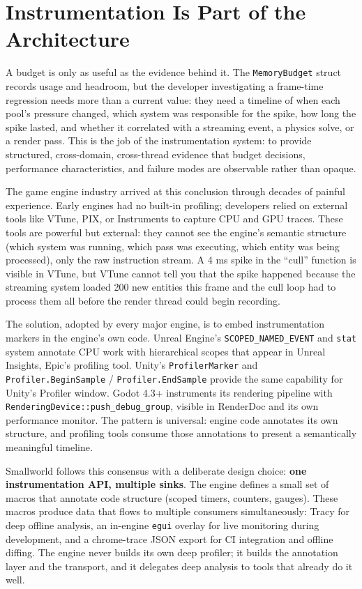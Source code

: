 \documentclass[
  11pt,
  letterpaper,
  DIV=11,
  numbers=noendperiod,
  twoside,
  open=right]{scrreprt}
\begin{document}
\section{Instrumentation Is Part of the
Architecture}\label{sec-instrumentation}

A budget is only as useful as the evidence behind it. The
\texttt{MemoryBudget} struct records usage and headroom, but the
developer investigating a frame-time regression needs more than a
current value: they need a timeline of when each pool's pressure
changed, which system was responsible for the spike, how long the spike
lasted, and whether it correlated with a streaming event, a physics
solve, or a render pass. This is the job of the instrumentation system:
to provide structured, cross-domain, cross-thread evidence that budget
decisions, performance characteristics, and failure modes are observable
rather than opaque.

The game engine industry arrived at this conclusion through decades of
painful experience. Early engines had no built-in profiling; developers
relied on external tools like VTune, PIX, or Instruments to capture CPU
and GPU traces. These tools are powerful but external: they cannot see
the engine's semantic structure (which system was running, which pass
was executing, which entity was being processed), only the raw
instruction stream. A 4 ms spike in the ``cull'' function is visible in
VTune, but VTune cannot tell you that the spike happened because the
streaming system loaded 200 new entities this frame and the cull loop
had to process them all before the render thread could begin recording.

The solution, adopted by every major engine, is to embed instrumentation
markers in the engine's own code. Unreal Engine's
\texttt{SCOPED\_NAMED\_EVENT} and \texttt{stat} system annotate CPU work
with hierarchical scopes that appear in Unreal Insights, Epic's
profiling tool. Unity's \texttt{ProfilerMarker} and
\texttt{Profiler.BeginSample} / \texttt{Profiler.EndSample} provide the
same capability for Unity's Profiler window. Godot 4.3+ instruments its
rendering pipeline with \texttt{RenderingDevice::push\_debug\_group},
visible in RenderDoc and its own performance monitor. The pattern is
universal: engine code annotates its own structure, and profiling tools
consume those annotations to present a semantically meaningful timeline.

Smallworld follows this consensus with a deliberate design choice:
\textbf{one instrumentation API, multiple sinks}. The engine defines a
small set of macros that annotate code structure (scoped timers,
counters, gauges). These macros produce data that flows to multiple
consumers simultaneously: Tracy for deep offline analysis, an in-engine
\texttt{egui} overlay for live monitoring during development, and a
chrome-trace JSON export for CI integration and offline diffing. The
engine never builds its own deep profiler; it builds the annotation
layer and the transport, and it delegates deep analysis to tools that
already do it well.
\end{document}

